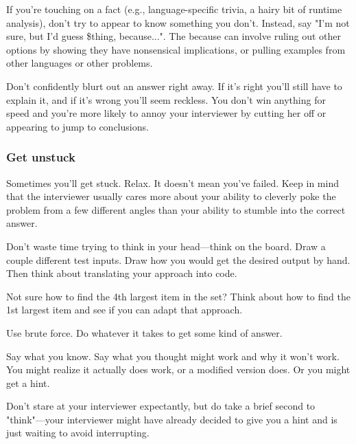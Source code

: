 \documentclass{article}
\begin{document}
 If you're touching on a fact (e.g., language-specific trivia, a hairy bit of runtime analysis), don't try to appear to know something you don't. Instead, say "I'm not sure, but I'd guess \$thing, because...". The because can involve ruling out other options by showing they have nonsensical implications, or pulling examples from other languages or other problems.


 Don't confidently blurt out an answer right away. If it's right you'll still have to explain it, and if it's wrong you'll seem reckless. You don't win anything for speed and you're more likely to annoy your interviewer by cutting her off or appearing to jump to conclusions.



\subsubsection{Get unstuck}

Sometimes you'll get stuck. Relax. It doesn't mean you've failed. Keep in mind that the interviewer usually cares more about your ability to cleverly poke the problem from a few different angles than your ability to stumble into the correct answer. 



 Don't waste time trying to think in your head—think on the board. Draw a couple different test inputs. Draw how you would get the desired output by hand. Then think about translating your approach into code.


 Not sure how to find the 4th largest item in the set? Think about how to find the 1st largest item and see if you can adapt that approach.


 Use brute force. Do whatever it takes to get some kind of answer.


 Say what you know. Say what you thought might work and why it won't work. You might realize it actually does work, or a modified version does. Or you might get a hint.

 Don't stare at your interviewer expectantly, but do take a brief second to "think"—your interviewer might have already decided to give you a hint and is just waiting to avoid interrupting.
\end{document}
